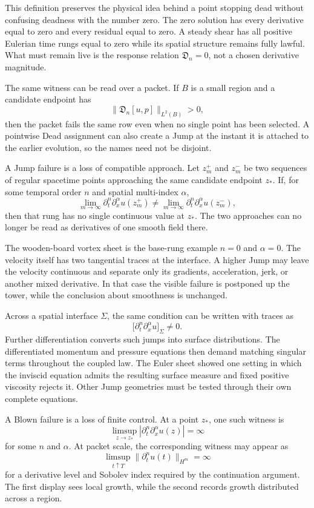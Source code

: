 This definition preserves the physical idea behind a point stopping dead without confusing deadness with the number zero.
The zero solution has every derivative equal to zero and every residual equal to zero.
A steady shear has all positive Eulerian time rungs equal to zero while its spatial structure remains fully lawful.
What must remain live is the response relation \(\mathfrak D_n=0\), not a chosen derivative magnitude.

The same witness can be read over a packet.
If \(B\) is a small region and a candidate endpoint has
\[
  \|\mathfrak D_n[u,p]\|_{L^2(B)}>0,
\]
then the packet fails the same row even when no single point has been selected.
A pointwise Dead assignment can also create a Jump at the instant it is attached to the earlier evolution, so the names need not be disjoint.


A Jump failure is a loss of compatible approach.
Let \(z_m^+\) and \(z_m^-\) be two sequences of regular spacetime points approaching the same candidate endpoint \(z_*\).
If, for some temporal order \(n\) and spatial multi-index \(\alpha\),
\[
  \lim_{m\to\infty}
  \partial_t^n\partial_x^\alpha u(z_m^+)
  \neq
  \lim_{m\to\infty}
  \partial_t^n\partial_x^\alpha u(z_m^-),
\]
then that rung has no single continuous value at \(z_*\).
The two approaches can no longer be read as derivatives of one smooth field there.

The wooden-board vortex sheet is the base-rung example \(n=0\) and \(\alpha=0\).
The velocity itself has two tangential traces at the interface.
A higher Jump may leave the velocity continuous and separate only its gradients, acceleration, jerk, or another mixed derivative.
In that case the visible failure is postponed up the tower, while the conclusion about smoothness is unchanged.

Across a spatial interface \(\Sigma\), the same condition can be written with traces as
\[
  \bigl[
    \partial_t^n\partial_x^\alpha u
  \bigr]_\Sigma
  \neq0.
\]
Further differentiation converts such jumps into surface distributions.
The differentiated momentum and pressure equations then demand matching singular terms throughout the coupled law.
The Euler sheet showed one setting in which the inviscid equation admits the resulting surface measure and fixed positive viscosity rejects it.
Other Jump geometries must be tested through their own complete equations.


A Blown failure is a loss of finite control.
At a point \(z_*\), one such witness is
\[
  \limsup_{z\to z_*}
  \left|
    \partial_t^n\partial_x^\alpha u(z)
  \right|
  =
  \infty
\]
for some \(n\) and \(\alpha\).
At packet scale, the corresponding witness may appear as
\[
  \limsup_{t\uparrow T}
  \|\partial_t^n u(t)\|_{H^m}
  =
  \infty
\]
for a derivative level and Sobolev index required by the continuation argument.
The first display sees local growth, while the second records growth distributed across a region.

